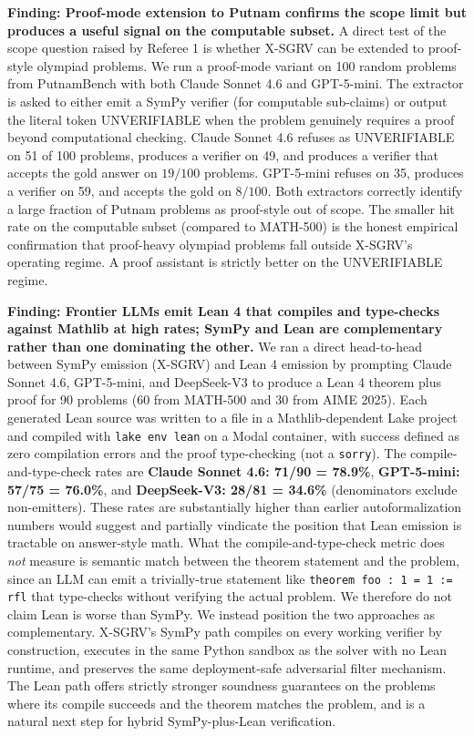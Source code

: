 \documentclass{article}
\begin{document}
\textbf{Finding: Proof-mode extension to Putnam confirms the scope limit but produces a useful signal on the computable subset.} A direct test of the scope question raised by Referee 1 is whether X-SGRV can be extended to proof-style olympiad problems. We run a proof-mode variant on 100 random problems from PutnamBench \citep{amitayusht2024putnambench} with both Claude Sonnet 4.6 and GPT-5-mini. The extractor is asked to either emit a SymPy verifier (for computable sub-claims) or output the literal token UNVERIFIABLE when the problem genuinely requires a proof beyond computational checking. Claude Sonnet 4.6 refuses as UNVERIFIABLE on 51 of 100 problems, produces a verifier on 49, and produces a verifier that accepts the gold answer on $19/100$ problems. GPT-5-mini refuses on 35, produces a verifier on 59, and accepts the gold on $8/100$. Both extractors correctly identify a large fraction of Putnam problems as proof-style out of scope. The smaller hit rate on the computable subset (compared to MATH-500) is the honest empirical confirmation that proof-heavy olympiad problems fall outside X-SGRV's operating regime. A proof assistant is strictly better on the UNVERIFIABLE regime.

\textbf{Finding: Frontier LLMs emit Lean 4 that compiles and type-checks against Mathlib at high rates; SymPy and Lean are complementary rather than one dominating the other.} We ran a direct head-to-head between SymPy emission (X-SGRV) and Lean 4 emission by prompting Claude Sonnet 4.6, GPT-5-mini, and DeepSeek-V3 to produce a Lean 4 theorem plus proof for 90 problems (60 from MATH-500 and 30 from AIME 2025). Each generated Lean source was written to a file in a Mathlib-dependent Lake project and compiled with \texttt{lake env lean} on a Modal container, with success defined as zero compilation errors and the proof type-checking (not a \texttt{sorry}). The compile-and-type-check rates are \textbf{Claude Sonnet 4.6: 71/90 = 78.9\%}, \textbf{GPT-5-mini: 57/75 = 76.0\%}, and \textbf{DeepSeek-V3: 28/81 = 34.6\%} (denominators exclude non-emitters). These rates are substantially higher than earlier autoformalization numbers would suggest and partially vindicate the position that Lean emission is tractable on answer-style math. What the compile-and-type-check metric does \emph{not} measure is semantic match between the theorem statement and the problem, since an LLM can emit a trivially-true statement like \texttt{theorem foo : 1 = 1 := rfl} that type-checks without verifying the actual problem. We therefore do not claim Lean is worse than SymPy. We instead position the two approaches as complementary. X-SGRV's SymPy path compiles on every working verifier by construction, executes in the same Python sandbox as the solver with no Lean runtime, and preserves the same deployment-safe adversarial filter mechanism. The Lean path offers strictly stronger soundness guarantees on the problems where its compile succeeds and the theorem matches the problem, and is a natural next step for hybrid SymPy-plus-Lean verification.
\end{document}
